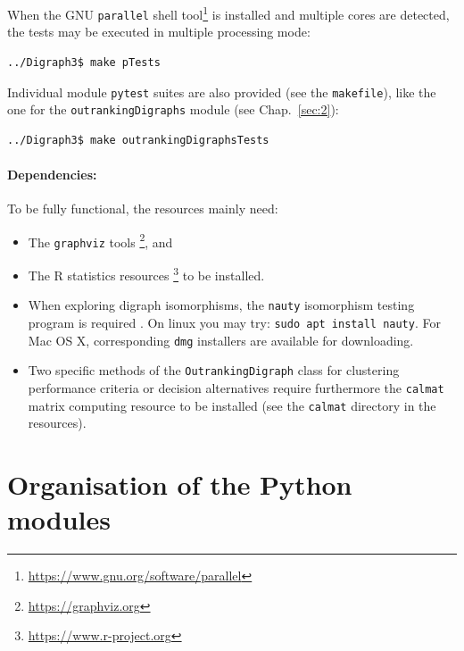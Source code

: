 When the GNU \texttt{parallel} shell tool\footnote{\href{https://www.gnu.org/software/parallel}{https://www.gnu.org/software/parallel}} is installed and multiple cores are detected, the tests may be executed in multiple processing mode:
\begin{lstlisting}[language=sh, backgroundcolor=\color{White}, numbers=none]
  ../Digraph3$ make pTests
\end{lstlisting}

Individual module \texttt{pytest} suites are also provided (see the \texttt{makefile}), like the one for the \texttt{outrankingDigraphs} module (see Chap.~\ref{sec:2}):
\begin{lstlisting}[language=sh, backgroundcolor=\color{White}, numbers=none]
../Digraph3$ make outrankingDigraphsTests
\end{lstlisting}

\paragraph{\textbf{Dependencies:}}

\noindent To be fully functional, the \Digraph resources mainly need:
\begin{itemize}[leftmargin=0.5cm,listparindent=0em,rightmargin=0.2cm,topsep=1pt]
\item The \texttt{graphviz} tools \citep{graphviz}\footnote{\href{https://graphviz.org}{https://graphviz.org}}, and 
\item The R statistics resources \footnote{\href{https://www.r-project.org}{https://www.r-project.org}} to be installed.
\item When exploring digraph isomorphisms, the \texttt{nauty} isomorphism testing program is required \citep*{nauty}. On linux you may try: \texttt{sudo apt install nauty}. For Mac OS X, corresponding \texttt{dmg} installers are available for downloading.
\item Two specific methods of the \texttt{OutrankingDigraph} class for clustering performance criteria or decision alternatives require furthermore the \texttt{calmat} matrix computing resource to be installed (see the \texttt{calmat} directory in the \Digraph resources).
\end{itemize}

\section{Organisation of the \Digraph Python modules}
\label{sec:1.2}

